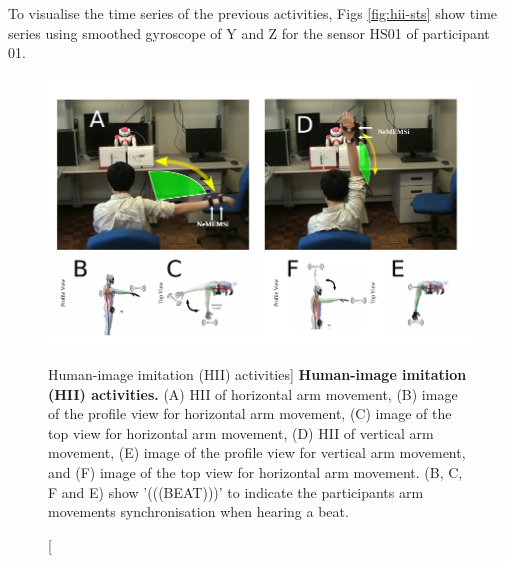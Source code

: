 To visualise the time series of the previous activities, Figs 
\ref{fig:hii-sts} show time series using smoothed gyroscope of Y and Z 
for the sensor HS01 of participant 01.
\begin{figure}
  \centering
  \includegraphics[width=1.0\textwidth]{hii}
    \caption
	[Human-image imitation (HII) activities]{
	{\bf Human-image imitation (HII) activities.} 
		(A) HII of horizontal arm movement, 
		(B) image of the profile view for horizontal arm movement,
		(C) image of the top view for horizontal arm movement,
		(D) HII of vertical arm movement, 
		(E) image of the profile view for vertical arm movement, and
		(F) image of the top view for horizontal arm movement.
		(B, C, F and E) show '(((BEAT)))' to indicate the participants
		arm movements synchronisation when hearing a beat.
        }
    \label{fig:hii}
\end{figure}
